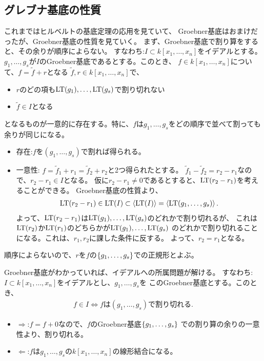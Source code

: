 \subsection{グレブナ基底の性質}
\label{sub:グレブナ基底の性質}
これまではヒルベルトの基底定理の応用を見ていて、
Groebner基底はおまけだったが、Groebner基底の性質を見ていく。
まず、Groebner基底で割り算をすると、その余りが順序によらない。
すなわち:$I\subset k[x_1,\dots,x_n]$をイデアルとする。
$g_1,\dots,g_s$が$I$のGroebner基底であるとする。このとき、
$f\in k[x_1,\dots,x_n]$について、$f=\tilde f + r$となる
$\tilde f,r \in k[x_1,\dots,x_n]$で、
\begin{itemize}
  \item $r$のどの項も${\rm LT}(g_1),\dots,{\rm LT}(g_s)$で割り切れない
  \item $\tilde f \in I$となる
\end{itemize}
となるものが一意的に存在する。特に、$f$は$g_1,\dots,g_s$をどの順序で並べて割っても余りが同じになる。
\begin{myproof}
  \begin{itemize}
    \item 存在:$f$を$(g_1,\dots,g_s)$で割れば得られる。
    \item 一意性: $f=\tilde f_1 + r_1 = \tilde f_2 + r_2$と2つ得られたとする。
    $\tilde f_1 - \tilde f_2 = r_2 - r_1$なので、$r_2 - r_1 \in I$となる。
    仮に$r_2 - r_1 \neq 0$であるとすると、${\rm LT}(r_2-r_1)$を考えることができる。
    Groebner基底の性質より、
    \begin{align}
      {\rm LT}(r_2-r_1) \in {\rm LT}(I) \subset \left\langle {\rm LT}(I) \right\rangle
      =
       \left\langle {\rm LT}(g_1,\dots,g_s) \right\rangle.
    \end{align}
    よって、${\rm LT}(r_2-r_1)$は${\rm LT}(g_1),\dots,{\rm LT}(g_s)$のどれかで割り切れるが、
    これは${\rm LT}(r_2)$か${\rm LT}(r_1)$のどちらかが${\rm LT}(g_1),\dots,{\rm LT}(g_s)$
    のどれかで割り切れることになる。これは、$r_1,r_2$に課した条件に反する。
    よって、$r_2 =r_1$となる。
  \end{itemize}
\end{myproof}

順序によらないので、$r$を$f$の$\left\{g_1,\dots,g_s\right\}$での正規形とよぶ。

Groebner基底がわかっていれば、イデアルへの所属問題が解ける。
すなわち:$I\subset k[x_1,\dots,x_n]$をイデアルとし、$g_1,\dots,g_s$を
このGroebner基底とする。このとき、
\begin{align}
  f \in I \iff f は (g_1,\dots,g_s) で割り切れる .
\end{align}
\begin{myproof}
  \begin{itemize}
    \item $\Rightarrow$:$f=f+0$なので、$f$のGroebner基底$\left\{g_1,\dots,g_s\right\}$
    での割り算の余りの一意性より、割り切れる。
    \item $\Leftarrow$:$f$は$g_1,\dots,g_s$の$k[x_1,\dots,x_n]$の線形結合になる。
  \end{itemize}
\end{myproof}

